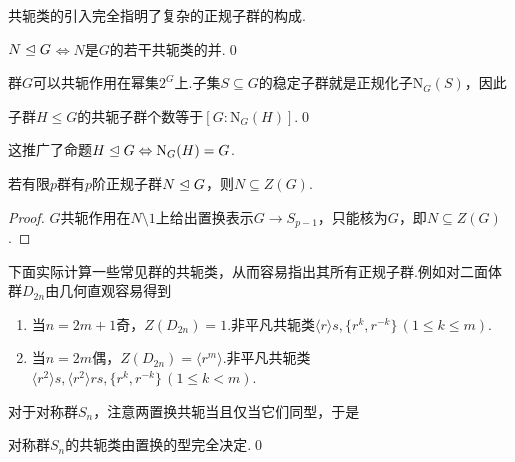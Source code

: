 共轭类的引入完全指明了复杂的正规子群的构成.
\begin{thm}
	$N\trianglelefteq G$$\iff$$N$是$G$的若干共轭类的并.\qed
\end{thm}

群$G$可以共轭作用在幂集$2^G$上.子集$S\subseteq G$的稳定子群就是正规化子$\mathrm{N}_G(S)$，因此
\begin{thm}
	子群$H\le G$的共轭子群个数等于$[G:\mathrm{N}_G(H)]$.\qed
\end{thm}
\begin{remark}
	这推广了命题$H\trianglelefteq G\Leftrightarrow\mathrm{N}_G(H)=G$.
\end{remark}
\begin{prop}
	若有限$p$群有$p$阶正规子群$N\trianglelefteq G$，则$N\subseteq Z(G)$.
\end{prop}
\begin{proof}
	$G$共轭作用在$N\setminus 1$上给出置换表示$G\to S_{p-1}$，只能核为$G$，即$N\subseteq Z(G)$.
\end{proof}

下面实际计算一些常见群的共轭类，从而容易指出其所有正规子群.例如对二面体群$D_{2n}$由几何直观容易得到
\begin{enumerate}
	\item 当$n=2m+1$奇，$Z(D_{2n})=1$.非平凡共轭类$\langle r\rangle s,\{r^k,r^{-k}\}\,(1\le k\le m)$.
	\item 当$n=2m$偶，$Z(D_{2n})=\langle r^m\rangle $.非平凡共轭类$\langle r^2\rangle s,\langle r^2\rangle rs,\{r^k,r^{-k}\}\,(1\le k<m)$.
\end{enumerate}

对于对称群$S_n$，注意两置换共轭当且仅当它们同型，于是
\begin{prop}
	对称群$S_n$的共轭类由置换的型完全决定.\qed
\end{prop}

